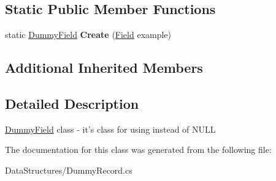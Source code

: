 \subsection*{Static Public Member Functions}
\begin{DoxyCompactItemize}
\item 
\hypertarget{class_dwarf_d_b_1_1_data_structures_1_1_dummy_field_aa36da679dfc36a7647002ef65055cca4}{static \hyperlink{class_dwarf_d_b_1_1_data_structures_1_1_dummy_field}{Dummy\+Field} {\bfseries Create} (\hyperlink{class_dwarf_d_b_1_1_data_structures_1_1_field}{Field} example)}\label{class_dwarf_d_b_1_1_data_structures_1_1_dummy_field_aa36da679dfc36a7647002ef65055cca4}

\end{DoxyCompactItemize}
\subsection*{Additional Inherited Members}


\subsection{Detailed Description}
\hyperlink{class_dwarf_d_b_1_1_data_structures_1_1_dummy_field}{Dummy\+Field} class -\/ it's class for using instead of N\+U\+L\+L 



The documentation for this class was generated from the following file\+:\begin{DoxyCompactItemize}
\item 
Data\+Structures/Dummy\+Record.\+cs\end{DoxyCompactItemize}
